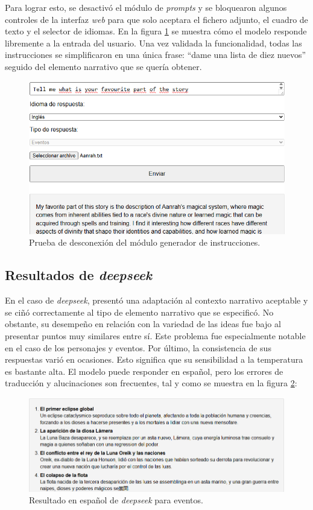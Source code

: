 Para lograr esto, se desactivó el módulo de \textit{prompts} y se bloquearon algunos controles de la interfaz
\textit{web} para que solo aceptara el fichero adjunto, el cuadro de texto y el selector de idiomas.
En la figura \ref{fig:prompt-test} se muestra
cómo el modelo responde libremente a la entrada del usuario.
Una vez validada la funcionalidad, todas las instrucciones se simplificaron en una única frase:
``dame una lista de diez nuevos'' seguido del elemento narrativo que se quería obtener.
\pagebreak
\begin{figure}[htbp]
	\centering
	\includegraphics[width=1\textwidth]{./Figures/promp-testing.png}
	\caption{Prueba de desconexión del módulo generador de instrucciones.}
	\label{fig:prompt-test}
\end{figure}

\subsection{Resultados de \textit{deepseek}}
En el caso de \textit{deepseek}, presentó una adaptación al contexto narrativo aceptable y se ciñó correctamente al
tipo de elemento narrativo que se especificó.
No obstante, su desempeño en relación con la variedad de las ideas fue bajo al presentar puntos muy similares entre sí.
Este problema fue especialmente notable en el caso de los personajes y eventos.
Por último, la consistencia de sus respuestas varió en ocasiones.
Esto significa que su sensibilidad a la temperatura es bastante alta.
El modelo puede responder en español, pero los errores de traducción y alucinaciones son frecuentes,
tal y como se muestra en la figura \ref{fig:deepseek-esp}:

\begin{figure}[htbp]
	\centering
	\includegraphics[width=1\textwidth]{./Figures/deepseek-noprompt-spanish.png}
	\caption{Resultado en español de \textit{deepseek} para eventos.}
	\label{fig:deepseek-esp}
\end{figure}
\pagebreak
